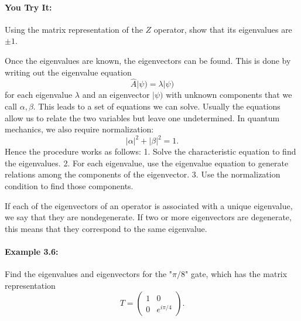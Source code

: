 \documentclass{article}
\begin{document}
\paragraph{You Try It:} 
Using the matrix representation of the \(Z\) operator, show that its eigenvalues are \(\pm 1\).

Once the eigenvalues are known, the eigenvectors can be found. This is done by writing out the eigenvalue equation
\[
\hat{A}|\psi) = \lambda|\psi)
\]
for each eigenvalue \(\lambda\) and an eigenvector \(|\psi)\) with unknown components that we call \(\alpha, \beta\). This leads to a set of equations we can solve. Usually the equations allow us to relate the two variables but leave one undetermined. In quantum mechanics, we also require normalization:
\[
|\alpha|^2 + |\beta|^2 = 1.
\]
Hence the procedure works as follows:  
1. Solve the characteristic equation to find the eigenvalues.  
2. For each eigenvalue, use the eigenvalue equation to generate relations among the components of the eigenvector.  
3. Use the normalization condition to find those components.

If each of the eigenvectors of an operator is associated with a unique eigenvalue, we say that they are nondegenerate. If two or more eigenvectors are degenerate, this means that they correspond to the same eigenvalue.

\paragraph{Example 3.6:}  
Find the eigenvalues and eigenvectors for the "\(\pi/8\)" gate, which has the matrix representation
\[
T = \begin{pmatrix}
1 & 0 \\
0 & e^{i\pi/4}
\end{pmatrix}.
\]
\end{document}
